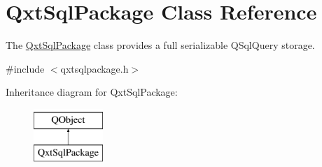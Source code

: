\hypertarget{class_qxt_sql_package}{\section{Qxt\-Sql\-Package Class Reference}
\label{class_qxt_sql_package}
}


The \hyperlink{class_qxt_sql_package}{Qxt\-Sql\-Package} class provides a full serializable Q\-Sql\-Query storage.  




{\ttfamily \#include $<$qxtsqlpackage.\-h$>$}

Inheritance diagram for Qxt\-Sql\-Package\-:\begin{figure}[H]
\begin{center}
\leavevmode
\includegraphics[height=2.000000cm]{class_qxt_sql_package}
\end{center}
\end{figure}
